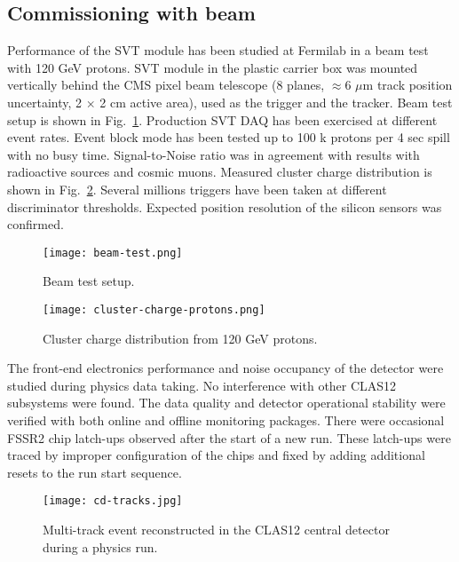 \subsection{Commissioning with beam}

Performance of the SVT module has been studied at Fermilab in a beam test with 120 GeV protons. SVT module in the plastic carrier box was mounted vertically behind the CMS pixel beam telescope (8 planes, $\approx$6 $\mu$m track position uncertainty, 2 $\times$ 2 cm active area), used as the trigger and the tracker. Beam test setup is shown in Fig.~\ref{fig:beam-test}. Production SVT DAQ has been exercised at different event rates. Event block mode has been tested up to 100 k protons per 4 sec spill with no busy time. Signal-to-Noise ratio was in agreement with results with radioactive sources and cosmic muons. Measured cluster charge distribution is shown in Fig.~\ref{fig:cluster-charge-protons}. Several millions triggers have been taken at different discriminator thresholds.  Expected position resolution of the silicon sensors was confirmed. 

\begin{figure}[hbt] 
\centering 
\texttt{[image: beam-test.png]}
\caption{Beam test setup.}
\label{fig:beam-test}
\end{figure}

\begin{figure}[h] 
\centering 
\texttt{[image: cluster-charge-protons.png]}
\caption{Cluster charge distribution from 120 GeV protons.}
\label{fig:cluster-charge-protons}
\end{figure}

The front-end electronics performance and noise occupancy of the detector were studied during physics data taking. No interference with other CLAS12 subsystems were found. The data quality and detector operational stability  were verified with both online and offline monitoring packages. There were occasional FSSR2 chip latch-ups observed after the start of a new run. These latch-ups were traced by improper configuration of the chips and fixed by adding additional resets to the run start sequence.

\begin{figure}[h] 
\centering 
\texttt{[image: cd-tracks.jpg]}
\caption{Multi-track event reconstructed in the CLAS12 central detector during a physics run.}
\label{fig:cd-tracks}
\end{figure}

